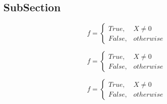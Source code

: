 \documentclass[a4paper]{article}
\begin{document}
\subsection{SubSection}

\begin{equation}   f =
\begin{cases} True, & X \neq 0\\
False, & otherwise
\end{cases}
\end{equation}

\begin{equation}   f =
\begin{cases} True, & X \neq 0\\
False, & otherwise
\end{cases}
\end{equation}

\begin{equation}   f =
\begin{cases} True, & X \neq 0\\
False, & otherwise
\end{cases}
\end{equation}
\end{document}

